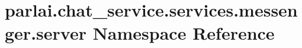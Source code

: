 \hypertarget{namespaceparlai_1_1chat__service_1_1services_1_1messenger_1_1server}{}\section{parlai.\+chat\+\_\+service.\+services.\+messenger.\+server Namespace Reference}
\label{namespaceparlai_1_1chat__service_1_1services_1_1messenger_1_1server}

